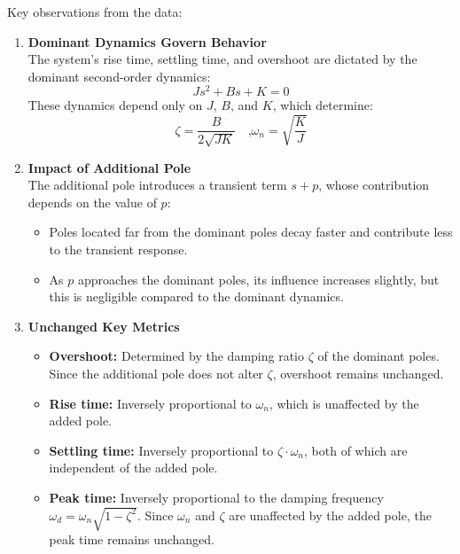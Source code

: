 \documentclass[a4paper, 12pt, english]{article}
\begin{document}
Key observations from the data:
\begin{enumerate}
    \item \textbf{Dominant Dynamics Govern Behavior}{\\}
    The system's rise time, settling time, and overshoot are dictated by the dominant second-order dynamics:
    \[ {J}{{s}^{2}} + {B}{s} + {K} = {0} \]
    These dynamics depend only on $J$, $B$, and $K$, which determine:
    \[ \zeta = \frac{B}{2\sqrt{{J}{K}}} \quad\mbox{,} {{\omega}_{n}} = {\sqrt{\frac{K}{J}}} \]
    \item \textbf{Impact of Additional Pole}{\\}
    The additional pole introduces a transient term $ {s} + {p} $, whose contribution depends on the value of $p$:
    \begin{itemize}
        \item Poles located far from the dominant poles decay faster and contribute less to the transient response.
        \item As $p$ approaches the dominant poles, its influence increases slightly, but this is negligible compared to the dominant dynamics.
    \end{itemize}
    \item \textbf{Unchanged Key Metrics}
    \begin{itemize}
        \item \textbf{Overshoot:}
        Determined by the damping ratio $\zeta$ of the dominant poles. Since the additional pole does not alter $\zeta$, overshoot remains unchanged.
        \item \textbf{Rise time:}
        Inversely proportional to $ {{\omega}_{n}} $, which is unaffected by the added pole.
        \item \textbf{Settling time:}
        Inversely proportional to $ {\zeta} \cdot {{\omega}_{n}} $, both of which are independent of the added pole.
        \item \textbf{Peak time:}
        Inversely proportional to the damping frequency $ {{\omega}_{d}} = {{\omega}_{n}} {\sqrt{{1} - {{\zeta}^{2}}}} $. Since $ {{\omega}_{n}} $ and $\zeta$ are unaffected by the added pole, the peak time remains unchanged.
    \end{itemize}
\end{enumerate}

\end{document}
